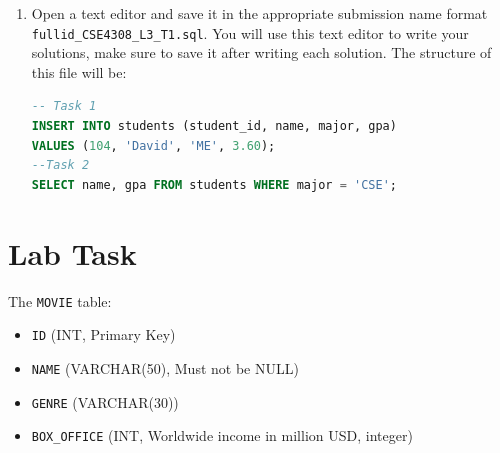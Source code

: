 \documentclass[12pt,a4paper]{article}
\begin{document}
\begin{enumerate}
After loading the SQL file, reconnect to PostgreSQL to verify that the tables have been created.

1. Reconnect to Your Database:

   \begin{lstlisting}[language=SQL]
   psql -h localhost -U student_12345 -d cse4308_12345
   \end{lstlisting}

2. Check Tables:

   Verify the tables have been created by listing them:

   \begin{lstlisting}[language=SQL]
   \dt
   \end{lstlisting}

3. View Table Data:

   Verify the data by running the following SQL queries:

   \begin{lstlisting}[language=SQL]
   SELECT * FROM <table_name>;
   \end{lstlisting}

\item Open a text editor and save it in the appropriate submission name format \\ \texttt{fullid\_CSE4308\_L3\_T1.sql}. You will use this text editor to write your solutions, make sure to save it after writing each solution. The structure of this file will be:
\begin{lstlisting}[language=SQL]
-- Task 1
INSERT INTO students (student_id, name, major, gpa)
VALUES (104, 'David', 'ME', 3.60);
--Task 2
SELECT name, gpa FROM students WHERE major = 'CSE';
\end{lstlisting}
\end{enumerate}
\newpage
\section{Lab Task}
The \texttt{MOVIE} table:
\begin{itemize}
        \item \texttt{ID} (INT, Primary Key)
        \item \texttt{NAME} (VARCHAR(50), Must not be NULL)
        \item \texttt{GENRE} (VARCHAR(30))
        \item \texttt{BOX\_OFFICE} (INT, Worldwide income in million USD, integer)
\end{itemize}
\end{document}
